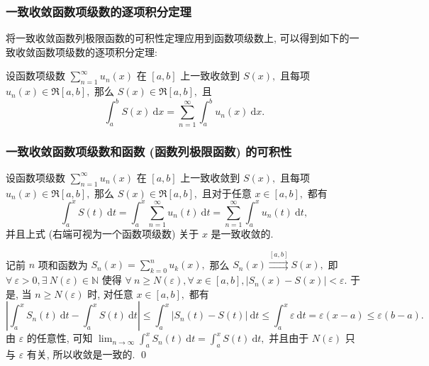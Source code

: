 
\begin{frame}
\frametitle{一致收敛函数项级数的逐项积分定理}

将一致收敛函数列极限函数的可积性定理应用到函数项级数上, 可以得到如下的一致收敛函数项级数的逐项积分定理:

\vspace{1em}

\begin{thm}[一致收敛函数项级数的逐项积分定理]
设函数项级数 $\displaystyle \sum_{n=1}^\infty u_n(x)$ 在 $[a, b]$ 上一致收敛到 $S(x),$ 且每项 $u_n(x) \in \mathfrak{R}[a, b],$ 那么 $S(x) \in \mathfrak{R}[a, b],$ 且
\[
\int_a^b S(x) ~ \mathrm{d}x = \sum_{n=1}^\infty \int_a^b u_n(x) ~ \mathrm{d}x.
\]
\end{thm}

\end{frame}


\begin{frame}
\frametitle{一致收敛函数项级数和函数 (函数列极限函数) 的可积性}

\begin{cor}[变上限积分的逐项积分定理]
设函数项级数 $\displaystyle \sum_{n=1}^\infty u_n(x)$ 在 $[a, b]$ 上一致收敛到 $S(x),$ 且每项 $u_n(x) \in \mathfrak{R}[a, b],$ 那么 $S(x) \in \mathfrak{R}[a, b],$ 且对于任意 $x \in [a, b],$ 都有
\[
\int_a^x S(t) ~ \mathrm{d}t = \int_a^x \sum_{n=1}^\infty u_n(t) ~ \mathrm{d}t = \sum_{n=1}^\infty \int_a^x u_n(t) ~ \mathrm{d}t,
\]
并且上式 (右端可视为一个函数项级数) 关于 $x$ 是一致收敛的.
\end{cor}

\startproof[bg=yellow, fg=red]
记前 $n$ 项和函数为 $S_n(x) = \sum_{k=0}^n u_k(x),$ 那么 $S_n(x) \stackrel{[a, b]}{\rightrightarrows} S(x),$ 即 $\forall ~ \varepsilon > 0, \exists ~ N(\varepsilon) \in \mathbb{N}$ 使得 $\forall ~ n \geqslant N(\varepsilon), \forall ~ x \in [a, b], |S_n(x) - S(x)| < \varepsilon.$
于是, 当 $n \geqslant N(\varepsilon)$ 时, 对任意 $x \in [a, b],$ 都有
\[
\left| \int_a^x S_n(t) ~ \mathrm{d}t - \int_a^x S(t) ~ \mathrm{d}t \right| \leqslant \int_a^x |S_n(t) - S(t)| ~ \mathrm{d}t \leqslant \int_a^x \varepsilon ~ \mathrm{d}t = \varepsilon (x - a) \leqslant \varepsilon (b - a).
\]
由 $\varepsilon$ 的任意性, 可知 $\displaystyle \lim_{n\to\infty} \int_a^x S_n(t) ~ \mathrm{d}t = \int_a^x S(t) ~ \mathrm{d}t,$ 并且由于 $N(\varepsilon)$ 只与 $\varepsilon$ 有关, 所以收敛是\alert{一致}的.
\qed

\end{frame}

